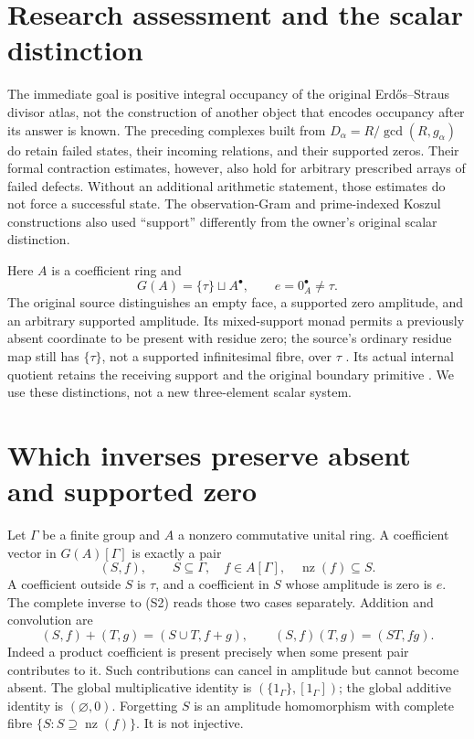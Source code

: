 \section{Research assessment and the scalar distinction}
The immediate goal is positive integral occupancy of the original
Erd\H{o}s--Straus divisor atlas, not the construction of another object that
encodes occupancy after its answer is known. The preceding complexes built
from $D_\alpha=R/\gcd(R,g_\alpha)$ do retain failed states, their incoming
relations, and their supported zeros. Their formal contraction estimates,
however, also hold for arbitrary prescribed arrays of failed defects. Without
an additional arithmetic statement, those estimates do not force a successful
state. The observation-Gram and prime-indexed Koszul constructions also used
``support'' differently from the owner's original scalar distinction.

Here $A$ is a coefficient ring and
\[
 G(A)=\{\tau\}\sqcup A^\bullet,\qquad e=0_A^\bullet\ne\tau.
 \tag{S1}
\]
The original source distinguishes an empty face, a supported zero amplitude,
and an arbitrary supported amplitude. Its mixed-support monad permits a
previously absent coordinate to be present with residue zero; the source's
ordinary residue map still has $\{\tau\}$, not a supported infinitesimal fibre,
over $\tau$ \cite[\S6.1--6.2]{Owner}. Its actual internal quotient retains the
receiving support and the original boundary primitive \cite[\S1--4]{Derived}.
We use these distinctions, not a new three-element scalar system.

\section{Which inverses preserve absent and supported zero}
Let $\Gamma$ be a finite group and $A$ a nonzero commutative unital ring.
A coefficient vector in $G(A)[\Gamma]$ is exactly a pair
\[
 (S,f),\qquad S\subseteq\Gamma,\quad f\in A[\Gamma],\quad
 \operatorname{nz}(f)\subseteq S.
 \tag{S2}
\]
A coefficient outside $S$ is $\tau$, and a coefficient in $S$ whose amplitude
is zero is $e$. The complete inverse to (S2) reads those two cases separately.
Addition and convolution are
\[
 (S,f)+(T,g)=(S\cup T,f+g),\qquad
 (S,f)(T,g)=(ST,fg).
 \tag{S3}
\]
Indeed a product coefficient is present precisely when some present pair
contributes to it. Such contributions can cancel in amplitude but cannot
become absent. The global multiplicative identity is
$(\{1_\Gamma\},[1_\Gamma])$; the global additive identity is $(\varnothing,0)$.
Forgetting $S$ is an amplitude homomorphism with complete fibre
$\{S:S\supseteq\operatorname{nz}(f)\}$. It is not injective.

